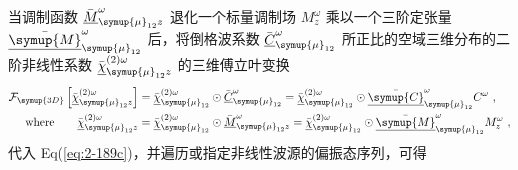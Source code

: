 当调制函数 $\bar{\underline{M}}^{\omega}_{{\symup{\mu}}_{12}z}$ 退化一个标量调制场 $M^{\omega}_{z}$ 乘以一个三阶定张量 $\bar{\underline{\symup{M}}}^{\omega}_{{\symup{\mu}}_{12}}$ 后，将倒格波系数 $\bar{\underline{C}}^{\omega}_{{\symup{\mu}}_{12}}$ 所正比的空域三维分布的二阶非线性系数 $\bar{\underline{\chi}}^{(2)\omega}_{ {\symup{\mu}}_{12}z}$ 的三维傅立叶变换
\begin{subequations} \label{eq:2-190}
	\abovedisplayskip=13pt
	\belowdisplayskip=13pt
	\begin{align}
		\mathcal F_{\symup{3D}} \left[ \bar{\underline{\chi}}^{(2)\omega}_{ {\symup{\mu}}_{12}z} \right] &= \bar{\underline{\chi}}^{(2)\omega}_{{\symup{\mu}}_{12}} \odot \bar{\underline{C}}^{\omega}_{{\symup{\mu}}_{12}} = \bar{\underline{\chi}}^{(2)\omega}_{{\symup{\mu}}_{12}} \odot \bar{\underline{\symup{C}}}^{\omega}_{{\symup{\mu}}_{12}} C^{\omega} \label{eq:2-190a}~, \\ \text{where}\ \ \ \ \ \ \bar{\underline{\chi}}^{(2)\omega}_{{\symup{\mu}}_{12}z} &= \bar{\underline{\chi}}^{(2)\omega}_{{\symup{\mu}}_{12}} \odot \bar{\underline{M}}^{\omega}_{{\symup{\mu}}_{12}z} = \bar{\underline{\chi}}^{(2)\omega}_{{\symup{\mu}}_{12}} \odot \bar{\underline{\symup{M}}}^{\omega}_{{\symup{\mu}}_{12}} M^{\omega}_{z} \label{eq:2-190b}~,
	\end{align}
\end{subequations}
代入 Eq(\ref{eq:2-189c})，并遍历或指定非线性波源的偏振态序列，可得
